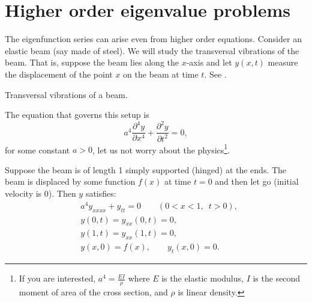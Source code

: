 
\sectionnewpage
\section{Higher order eigenvalue problems}
\label{sec:appeig}


The eigenfunction series can arise even from higher order equations.
Consider an elastic beam (say made of steel).  We will study the
transversal vibrations of the beam.  That is, suppose the beam lies along
the $x$-axis and let $y(x,t)$ measure the displacement of the point $x$
on the beam at time $t$.  See .

\begin{myfig}
\capstart
{}
\caption{Transversal vibrations of a beam.\label{appeig:transbeamfig}}
\end{myfig}

The equation that governs this setup is
\begin{equation*}
a^4 \frac{\partial^4 y}{\partial x^4} + \frac{\partial^2 y}{\partial t^2} = 0,
\end{equation*}
for some constant $a > 0$, let us not worry about the physics\footnote{If
you are interested, $a^4 = \frac{EI}{\rho}$ where $E$ is the elastic
modulus, $I$ is the second moment of area of the cross section,
and $\rho$ is linear density.}.

Suppose the beam is of length 1 simply supported (hinged) at the ends.
The beam is displaced by some function $f(x)$ at time $t=0$ and then
let go (initial velocity is 0).  Then $y$ satisfies:
\begin{equation} \label{appeig:beameq}
\begin{aligned}
& a^4 y_{xxxx} + y_{tt} = 0 \qquad (0 < x < 1, \enspace t > 0), \\
& y(0,t) = y_{xx}(0,t) = 0 , \\
& y(1,t) = y_{xx}(1,t) = 0 , \\
& y(x,0) = f(x), \qquad y_{t}(x,0) = 0 .
\end{aligned}
\end{equation}

